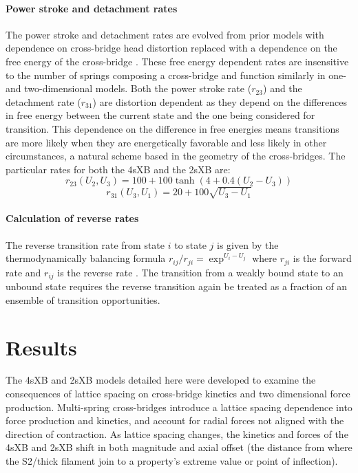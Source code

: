 \documentclass[]{article}
\begin{document}
\paragraph{Power stroke and detachment rates} %
The power stroke and detachment rates are evolved from prior models with dependence on cross-bridge head distortion replaced with a dependence on the free energy of the cross-bridge \citep{Pate1989, Tanner2007}.
These free energy dependent rates are insensitive to the number of springs composing a cross-bridge and function similarly in one- and two-dimensional models. 
Both the power stroke rate ($r_{23}$) and the detachment rate ($r_{31}$) are distortion dependent as they depend on the differences in free energy between the current state and the one being considered for transition. 
This dependence on the difference in free energies means transitions are more likely when they are energetically favorable and less likely in other circumstances, a natural scheme based in the geometry of the cross-bridges.
The particular rates for both the 4sXB and the 2sXB are: 
$$r_{23}(U_2, U_3) = 100 + 100\tanh(4 + 0.4 (U_2 - U_3)) $$
$$r_{31}(U_3, U_1) = 20 + 100 \sqrt{U_3 - U_1} $$

\paragraph{Calculation of reverse rates} %
The reverse transition rate from state $i$ to state $j$ is given by the thermodynamically balancing formula $r_{ij}/r_{ji}=\exp^{U_i-U_j}$ where $r_{ji}$ is the forward rate and $r_{ij}$ is the reverse rate \citep{Pate1989, Daniel1998, Tanner2007}.
The transition from a weakly bound state to an unbound state requires the reverse transition again be treated as a fraction of an ensemble of transition opportunities. 



\section*{Results} %

The 4sXB and 2sXB models detailed here were developed to examine the consequences of lattice spacing on cross-bridge kinetics and two dimensional force production.
Multi-spring cross-bridges introduce a lattice spacing dependence into force production and kinetics, and account for radial forces not aligned with the direction of contraction. 
As lattice spacing changes, the kinetics and forces of the 4sXB and 2sXB shift in both magnitude and axial offset (the distance from where the S2/thick filament join to a property's extreme value or point of inflection).
\end{document}
